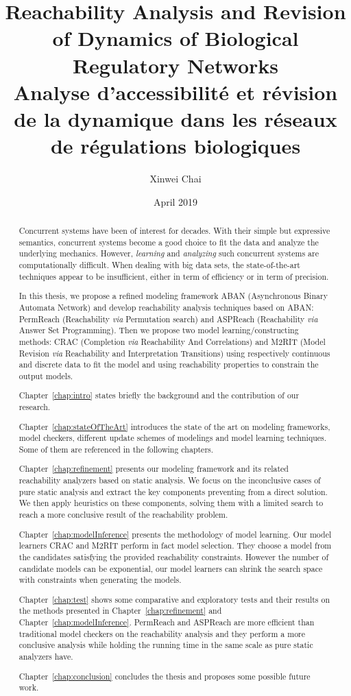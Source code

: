 \documentclass[11pt,twoside,openright]{report}
\title{Reachability Analysis and Revision of Dynamics of Biological Regulatory Networks
\\
\large Analyse d'accessibilit\'e et r\'evision de la dynamique dans les r\'eseaux de r\'egulations biologiques
}
\date{April 2019}
\author{Xinwei Chai}
\theoremstyle{definition}
\begin{document}
\maketitle
\tableofcontents
\listoffigures
\listoftables

\begin{abstract}
Concurrent systems have been of interest for decades.
With their simple but expressive semantics, concurrent systems become a good choice to fit the data and analyze the underlying mechanics.
However, \textit{learning} and \textit{analyzing} such concurrent systems are computationally difficult.
When dealing with big data sets, the state-of-the-art techniques appear to be insufficient, either in term of efficiency or in term of precision.

In this thesis, we propose a refined modeling framework ABAN (Asynchronous Binary Automata Network) and develop reachability analysis techniques based on ABAN: PermReach (Reachability \textit{via} Permutation search) and ASPReach (Reachability \textit{via} Answer Set Programming).
Then we propose two model learning/constructing methods: CRAC (Completion \textit{via} Reachability And Correlations) and M2RIT (Model Revision \textit{via} Reachability and Interpretation Transitions) using respectively continuous and discrete data to fit the model and using reachability properties to constrain the output models.

Chapter~\ref{chap:intro} states briefly the background and the contribution of our research.

Chapter~\ref{chap:stateOfTheArt} introduces the state of the art on modeling frameworks, model checkers, different update schemes of modelings and model learning techniques.
Some of them are referenced in the following chapters.

Chapter~\ref{chap:refinement} presents our modeling framework and its related reachability analyzers based on static analysis.
We focus on the inconclusive cases of pure static analysis and extract the key components preventing from a direct solution.
We then apply heuristics on these components, solving them with a limited search to reach a more conclusive result of the reachability problem.

Chapter~\ref{chap:modelInference} presents the methodology of model learning.
Our model learners CRAC and M2RIT perform in fact model selection. 
They choose a model from the candidates satisfying the provided reachability constraints.
However the number of candidate models can be exponential, our model learners can shrink the search space with constraints when generating the models.

Chapter~\ref{chap:test} shows some comparative and exploratory tests and their results on the methods presented in Chapter~\ref{chap:refinement} and Chapter~\ref{chap:modelInference}.
PermReach and ASPReach are more efficient than traditional model checkers on the reachability analysis and they perform a more conclusive analysis while holding the running time in the same scale as pure static analyzers have.

Chapter~\ref{chap:conclusion} concludes the thesis and proposes some possible future work.
\end{abstract}
\end{document}
